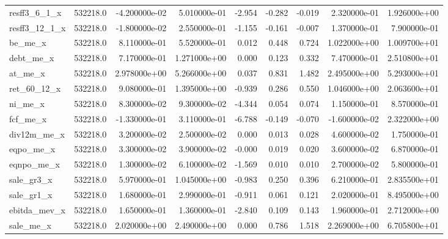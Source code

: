 \documentclass[12pt]{article}
\begin{document}
\begin{landscape}
\begin{longtable}{|l|r|r|r|r|r|r|r|r|}
		resff3\_6\_1\_x          & 532218.0 & -4.200000e-02 & 5.010000e-01 & -2.954     & -0.282      & -0.019      & 2.320000e-01  & 1.926000e+00 \\
		resff3\_12\_1\_x         & 532218.0 & -1.800000e-02 & 2.550000e-01 & -1.155     & -0.161      & -0.007      & 1.370000e-01  & 7.900000e-01 \\
		be\_me\_x                & 532218.0 & 8.110000e-01  & 5.520000e-01 & 0.012      & 0.448       & 0.724       & 1.022000e+00  & 1.009700e+01 \\
		debt\_me\_x              & 532218.0 & 7.170000e-01  & 1.271000e+00 & 0.000      & 0.123       & 0.332       & 7.470000e-01  & 2.510800e+01 \\
		at\_me\_x                & 532218.0 & 2.978000e+00  & 5.266000e+00 & 0.037      & 0.831       & 1.482       & 2.495000e+00  & 5.293000e+01 \\
		ret\_60\_12\_x           & 532218.0 & 9.080000e-01  & 1.395000e+00 & -0.939     & 0.286       & 0.550       & 1.046000e+00  & 2.063600e+01 \\
		ni\_me\_x                & 532218.0 & 8.300000e-02  & 9.300000e-02 & -4.344     & 0.054       & 0.074       & 1.150000e-01  & 8.570000e-01 \\
		fcf\_me\_x               & 532218.0 & -1.330000e-01 & 3.110000e-01 & -6.788     & -0.149      & -0.070      & -1.600000e-02 & 2.322000e+00 \\
		div12m\_me\_x            & 532218.0 & 3.200000e-02  & 2.500000e-02 & 0.000      & 0.013       & 0.028       & 4.600000e-02  & 1.750000e-01 \\
		eqpo\_me\_x              & 532218.0 & 3.300000e-02  & 3.900000e-02 & -0.000     & 0.019       & 0.020       & 3.600000e-02  & 6.870000e-01 \\
		eqnpo\_me\_x             & 532218.0 & 1.300000e-02  & 6.100000e-02 & -1.569     & 0.010       & 0.010       & 2.700000e-02  & 5.800000e-01 \\
		sale\_gr3\_x             & 532218.0 & 5.970000e-01  & 1.045000e+00 & -0.983     & 0.250       & 0.396       & 6.210000e-01  & 2.835500e+01 \\
		sale\_gr1\_x             & 532218.0 & 1.680000e-01  & 2.990000e-01 & -0.911     & 0.061       & 0.121       & 2.020000e-01  & 8.495000e+00 \\
		ebitda\_mev\_x           & 532218.0 & 1.650000e-01  & 1.360000e-01 & -2.840     & 0.109       & 0.143       & 1.960000e-01  & 2.712000e+00 \\
		sale\_me\_x              & 532218.0 & 2.020000e+00  & 2.490000e+00 & 0.000      & 0.786       & 1.518       & 2.269000e+00  & 6.705800e+01 \\

\end{longtable}
\end{landscape}
\end{document}
